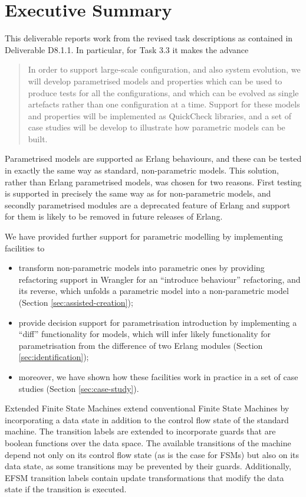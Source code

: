 \section*{Executive Summary}

This deliverable reports work from the revised task descriptions as contained in Deliverable D8.1.1. In particular, for Task 3.3 it makes the advance
\begin{quote}
In order to support large-scale configuration, and also system evolution, we will develop parametrised models and properties which can be used to produce tests for all the configurations, and which can be evolved as single artefacts rather than one configuration at a time. Support for these models and properties will be implemented as QuickCheck libraries, and a set of case studies will be develop to illustrate how parametric models can be built.
\end{quote}
Parametrised models are supported as Erlang behaviours, and these can be tested in exactly the same way as standard, non-parametric models. This solution, rather than Erlang parametrised models, was chosen for two reasons. First testing is supported in precisely the same way as for non-parametric models, and secondly parametrised modules are a deprecated feature of Erlang and support for them is likely to be removed in future releases of Erlang.

We have provided further support for parametric modelling by implementing facilities to
\begin{itemize}
\item
transform non-parametric models into parametric ones by providing refactoring support in Wrangler for an ``introduce behaviour'' refactoring, and its reverse, which unfolds a parametric model into a non-parametric model (Section \ref{sec:assisted-creation});
\item
provide decision support for parametrisation introduction by implementing a ``diff'' functionality for models, which will infer likely functionality for parametrisation from the difference of two Erlang modules (Section \ref{sec:identification});
\item
moreover, we have shown how these facilities work in practice in a set of case studies (Section \ref{sec:case-study}).
\end{itemize}



Extended Finite State Machines extend conventional Finite State Machines by incorporating a data state in addition to the control flow state of the standard machine. The transition labels are extended to incorporate guards that are boolean functions over the data space. The available transitions of the machine depend not only on its control flow state (as is the case for FSMs) but also on its data state, as some transitions may be prevented by their guards. Additionally, EFSM transition labels contain update transformations that modify the data state if the transition is executed. 

